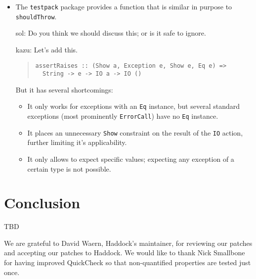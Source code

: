 \documentclass[preprint]{sigplanconf}
\begin{document}
\begin{itemize}
    \item The {\tt testpack} package provides a function that is
        similar in purpose to {\tt shouldThrow}.

        sol: Do you think we should discuss this; or is it safe to
        ignore.

        kazu: Let's add this.

\begin{quote}\small\begin{verbatim}
assertRaises :: (Show a, Exception e, Show e, Eq e) =>
  String -> e -> IO a -> IO ()
\end{verbatim}\end{quote}
        But it has several shortcomings:
        \begin{itemize}
            \item
                It only works for exceptions with an {\tt Eq}
                instance, but several standard exceptions (most
                prominently {\tt ErrorCall}) have no {\tt Eq}
                instance.
            \item
                It places an unnecessary {\tt Show} constraint on the
                result of the {\tt IO} action, further limiting it's
                applicability.
            \item
                It only allows to expect specific values; expecting
                any exception of a certain type is not possible.
        \end{itemize}
\end{itemize}

\section{Conclusion}

TBD

\acks

We are grateful to David Waern, Haddock's maintainer, for reviewing our patches
and accepting our patches to Haddock.
We would like to thank
Nick Smallbone for having improved QuickCheck so that
non-quantified properties are tested just once.




\end{document}
